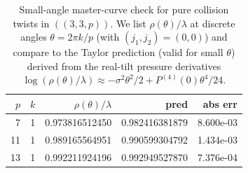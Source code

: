 \begin{table}[H]
\centering
\scriptsize
\setlength{\tabcolsep}{6pt}
\caption{Small-angle master-curve check for pure collision twists in $((3,3,p))$. We list $\rho(\theta)/\lambda$ at discrete angles $\theta=2\pi k/p$ (with $(j_1,j_2)=(0,0)$) and compare to the Taylor prediction (valid for small $\theta$) derived from the real-tilt pressure derivatives $\log(\rho(\theta)/\lambda)\approx -\sigma^2\theta^2/2+P^{(4)}(0)\theta^4/24$.}
\label{tab:real_input_40_arity_335_n2_master_curve}
\begin{tabular}{r r r r r}
\toprule
$p$ & $k$ & $\rho(\theta)/\lambda$ & pred & abs err\\
\midrule
7 & 1 & 0.973816512450 & 0.982416381879 & 8.600e-03\\
11 & 1 & 0.989165564951 & 0.990599304792 & 1.434e-03\\
13 & 1 & 0.992211924196 & 0.992949527870 & 7.376e-04\\
\bottomrule
\end{tabular}
\end{table}
